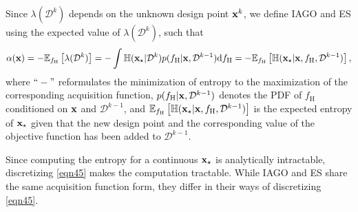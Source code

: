 \documentclass[journal ]{new-aiaa}
\begin{document}
Since $\lambda(\mathcal{D}^{k})$ depends on the unknown design point ${\bf x}^k$, we define IAGO and ES using the expected value of $\lambda(\mathcal{D}^{k})$, such that
\begin{equation}\label{eqn45}
		\alpha({\bf x}) = -\mathbb{E}_{f_\text{H}}\left[\lambda(\mathcal{D}^{k})\right]
		 = -\int \mathbb{H}({\bf x}_\star|\mathcal{D}^{k})  p(f_\text{H}|{\bf x},\mathcal{D}^{k-1}) \text{d}f_\text{H}
		 = -\mathbb{E}_{f_\text{H}}\left[\mathbb{H}({\bf x}_\star|{\bf x},f_\text{H},\mathcal{D}^{k-1})\right],
\end{equation}
where $``-"$ reformulates the minimization of entropy to the maximization of the corresponding acquisition function, $p(f_\text{H}|{\bf x},\mathcal{D}^{k-1})$ denotes the PDF of $f_\text{H}$ conditioned on $\bf x$ and $\mathcal{D}^{k-1}$, and $\mathbb{E}_{f_\text{H}}\left[\mathbb{H}({\bf x}_\star|{\bf x},f_\text{H},\mathcal{D}^{k-1})\right]$ is the expected entropy of ${\bf x}_\star$ given that the new design point and the corresponding value of the objective function has been added to $\mathcal{D}^{k-1}$.

Since computing the entropy for a continuous ${\bf x}_\star$ is analytically intractable, discretizing \cref{eqn45} makes the computation tractable.
While IAGO and ES share the same acquisition function form, they differ in their ways of discretizing \cref{eqn45}.
\end{document}
